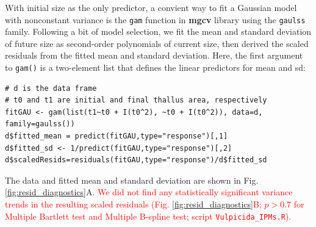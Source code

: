\documentclass[12pt]{article}
\newcommand{\new}{\textcolor{red}}
\begin{document}
With initial size as the only predictor, a convient way to fit a Gaussian model with nonconstant variance is the \texttt{gam} function in \textbf{mgcv} library \citep{wood-2017} using the \texttt{gaulss} family. 
Following a bit of model selection, we fit the mean and standard deviation of future size as second-order polynomials of current size, then derived the scaled residuals from the fitted mean and standard deviation.
Here, the first argument to \texttt{gam()} is a two-element list that defines the linear predictors for mean and sd:
\begin{lstlisting}
# d is the data frame
# t0 and t1 are initial and final thallus area, respectively
fitGAU <- gam(list(t1~t0 + I(t0^2), ~t0 + I(t0^2)), data=d, family=gaulss())
d$fitted_mean = predict(fitGAU,type="response")[,1]
d$fitted_sd <- 1/predict(fitGAU,type="response")[,2]
d$scaledResids=residuals(fitGAU,type="response")/d$fitted_sd
\end{lstlisting}
The data and fitted mean and standard deviation are shown in Fig. \ref{fig:resid_diagnostics}A. \new{We did not find any statistically significant variance trends in the 
resulting scaled residuals (Fig. \ref{fig:resid_diagnostics}B; $p>0.7$ for Multiple Bartlett test and Multiple B-spline test; script \texttt{Vulpicida\_IPMs.R}).} 
\end{document}

